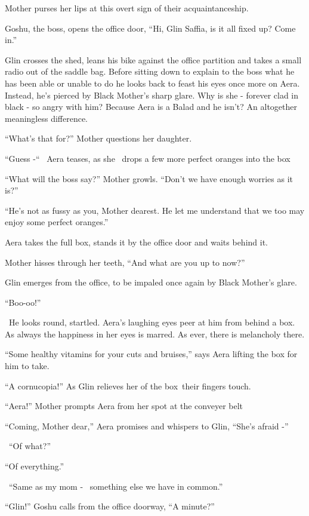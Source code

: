 \documentclass[twoside,11pt]{book}
\begin{document}
Mother purses her lips at this overt sign of their acquaintanceship.~~~~~~~

Goshu, the boss, opens the office door, ``Hi, Glin Saffia, is it all fixed up? Come in.''

Glin crosses the shed, leans his bike against the office partition and takes a small radio out of the saddle bag. Before
sitting down to explain to the boss what he has been able or unable to do he looks back to feast his eyes once more on
Aera. Instead, he's pierced by Black Mother's sharp glare. Why is she - forever clad in black - so angry with him?
Because Aera is a Balad and he isn't? An altogether meaningless difference.

``What's that for?'' Mother questions her daughter.

``Guess -``~ Aera teases, as she \ drops a few more perfect oranges into the box

``What will the boss say?'' Mother growls. ``Don't we have enough worries as it
is?''

``He's not as fussy as you, Mother dearest. He let me understand that we too may enjoy some perfect
oranges.''

Aera takes the full box, stands it by the office door and waits behind it.

Mother hisses through her teeth, ``And what are you up to now?''

Glin emerges from the office, to be impaled once again by Black Mother's glare.

``Boo-oo!''

~He looks round, startled. Aera's laughing eyes peer at him from behind a box. As always the happiness in her eyes is
marred. As ever, there is melancholy there.

``Some healthy vitamins for your cuts and bruises,'' says Aera lifting the box for him to
take.

``A cornucopia!'' As Glin relieves her of the box~their fingers touch.

``Aera!'' Mother prompts Aera from her spot at the conveyer belt

``Coming, Mother dear,'' Aera promises and whispers to Glin, ``She's afraid
-''

~``Of what?''

``Of everything.''

~``Same as my mom - \ something else we have in common.''

``Glin!'' Goshu calls from the office doorway, ``A minute?''
\end{document}
